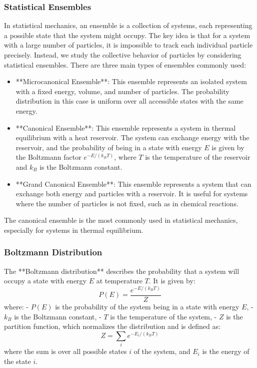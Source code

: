 \documentclass{article}
\begin{document}
\subsubsection*{Statistical Ensembles}

In statistical mechanics, an ensemble is a collection of systems, each representing a possible state that the system might occupy. The key idea is that for a system with a large number of particles, it is impossible to track each individual particle precisely. Instead, we study the collective behavior of particles by considering statistical ensembles. There are three main types of ensembles commonly used:

\begin{itemize}
    \item **Microcanonical Ensemble**: This ensemble represents an isolated system with a fixed energy, volume, and number of particles. The probability distribution in this case is uniform over all accessible states with the same energy.
    \item **Canonical Ensemble**: This ensemble represents a system in thermal equilibrium with a heat reservoir. The system can exchange energy with the reservoir, and the probability of being in a state with energy \( E \) is given by the Boltzmann factor \( e^{-E/(k_B T)} \), where \( T \) is the temperature of the reservoir and \( k_B \) is the Boltzmann constant.
    \item **Grand Canonical Ensemble**: This ensemble represents a system that can exchange both energy and particles with a reservoir. It is useful for systems where the number of particles is not fixed, such as in chemical reactions.
\end{itemize}

The canonical ensemble is the most commonly used in statistical mechanics, especially for systems in thermal equilibrium.

\subsubsection*{Boltzmann Distribution}

The **Boltzmann distribution** describes the probability that a system will occupy a state with energy \( E \) at temperature \( T \). It is given by:
\[
P(E) = \frac{e^{-E/(k_B T)}}{Z}
\]
where:
- \( P(E) \) is the probability of the system being in a state with energy \( E \),
- \( k_B \) is the Boltzmann constant,
- \( T \) is the temperature of the system,
- \( Z \) is the partition function, which normalizes the distribution and is defined as:
\[
Z = \sum_{i} e^{-E_i/(k_B T)}
\]
where the sum is over all possible states \( i \) of the system, and \( E_i \) is the energy of the state \( i \).
\end{document}
